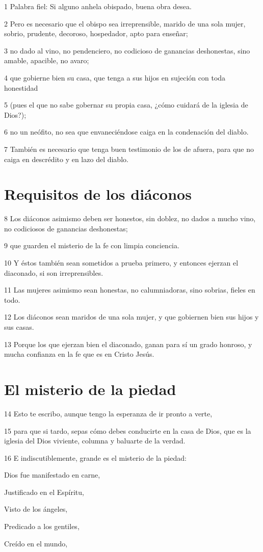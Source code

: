 \par 1 Palabra fiel: Si alguno anhela obispado, buena obra desea.
\par 2 Pero es necesario que el obispo sea irreprensible, marido de una sola mujer, sobrio, prudente, decoroso, hospedador, apto para enseñar;
\par 3 no dado al vino, no pendenciero, no codicioso de ganancias deshonestas, sino amable, apacible, no avaro;
\par 4 que gobierne bien su casa, que tenga a sus hijos en sujeción con toda honestidad
\par 5 (pues el que no sabe gobernar su propia casa, ¿cómo cuidará de la iglesia de Dios?);
\par 6 no un neófito, no sea que envaneciéndose caiga en la condenación del diablo.
\par 7 También es necesario que tenga buen testimonio de los de afuera, para que no caiga en descrédito y en lazo del diablo.

\section*{Requisitos de los diáconos}

\par 8 Los diáconos asimismo deben ser honestos, sin doblez, no dados a mucho vino, no codiciosos de ganancias deshonestas;
\par 9 que guarden el misterio de la fe con limpia conciencia.
\par 10 Y éstos también sean sometidos a prueba primero, y entonces ejerzan el diaconado, si son irreprensibles.
\par 11 Las mujeres asimismo sean honestas, no calumniadoras, sino sobrias, fieles en todo.
\par 12 Los diáconos sean maridos de una sola mujer, y que gobiernen bien sus hijos y sus casas.
\par 13 Porque los que ejerzan bien el diaconado, ganan para sí un grado honroso, y mucha confianza en la fe que es en Cristo Jesús.

\section*{El misterio de la piedad}

\par 14 Esto te escribo, aunque tengo la esperanza de ir pronto a verte,
\par 15 para que si tardo, sepas cómo debes conducirte en la casa de Dios, que es la iglesia del Dios viviente, columna y baluarte de la verdad.
\par 16 E indiscutiblemente, grande es el misterio de la piedad:
\par Dios fue manifestado en carne,
\par Justificado en el Espíritu,
\par Visto de los ángeles,
\par Predicado a los gentiles,
\par Creído en el mundo,
